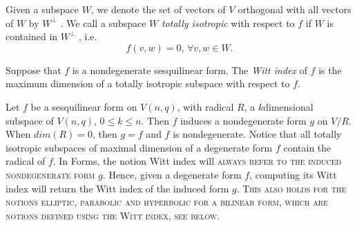 \documentclass[a4paper,11pt]{report}
\begin{document}
{{Given a subspace $W$, we denote the set of vectors of $V$ orthogonal with all vectors of $W$ by $W^\perp$ . We call a subspace $W$ \emph{totally isotropic} with respect to $f$ if $W$ is contained in $W^\perp$ , i.e.  
\[f(v,w) = 0,\, \forall v,w \in W.\]
   

Suppose that $f$ is a non\texttt{}degenerate sesquilinear form. The \emph{Witt index} of $f$ is the maximum dimension of a totally isotropic subspace with respect to $f$. 

 Let $f$ be a sesquilinear form on $V(n,q)$, with radical $R$, a $k$\texttt{}dimensional subspace of $V(n,q)$, $0 \leq k \leq n$. Then $f$ induces a non\texttt{}degenerate form $g$ on $V/R$. When $dim(R)=0$, then $g=f$ and $f$ is non\texttt{}degenerate. Notice that all totally isotropic
subspaces of maximal dimension of a degenerate form $f$ contain the radical of $f$. In \textsf{Forms}, the notion Witt index will \textsc{always refer to the induced non\texttt{}degenerate form} $g$. Hence, given a degenerate form $f$, computing its Witt index will return the Witt index of the induced form $g$. \textsc{This also holds for the notions elliptic, parabolic and hyperbolic for a
bilinear form, which are notions defined using the Witt index, see below}. 

}}
\end{document}
